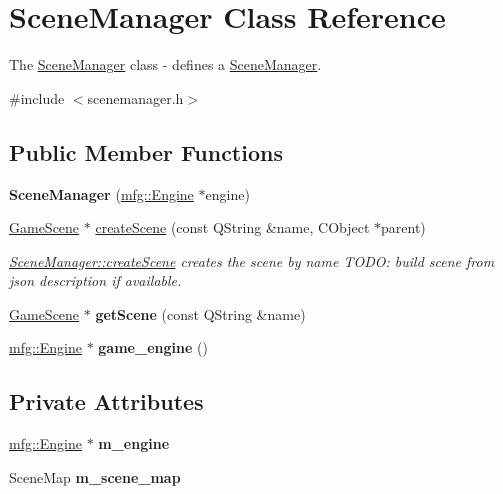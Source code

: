 \hypertarget{class_scene_manager}{}\section{Scene\+Manager Class Reference}
\label{class_scene_manager}


The \hyperlink{class_scene_manager}{Scene\+Manager} class -\/ defines a \hyperlink{class_scene_manager}{Scene\+Manager}.  




{\ttfamily \#include $<$scenemanager.\+h$>$}

\subsection*{Public Member Functions}
\begin{DoxyCompactItemize}
\item 
\mbox{\label{class_scene_manager_a017968ad7fea883b37597ccd43ee8d21}} 
{\bfseries Scene\+Manager} (\hyperlink{classmfg_1_1_engine}{mfg\+::\+Engine} $\ast$engine)
\item 
\hyperlink{class_game_scene}{Game\+Scene} $\ast$ \hyperlink{class_scene_manager_ac862660ed44b8ab110dec97ec90a9bad}{create\+Scene} (const Q\+String \&name, C\+Object $\ast$parent)
\begin{DoxyCompactList}\small\item\em \hyperlink{class_scene_manager_ac862660ed44b8ab110dec97ec90a9bad}{Scene\+Manager\+::create\+Scene} creates the scene by name T\+O\+DO\+: build scene from json description if available. \end{DoxyCompactList}\item 
\mbox{\label{class_scene_manager_a1f8394061bc73982c2893bb4984f4542}} 
\hyperlink{class_game_scene}{Game\+Scene} $\ast$ {\bfseries get\+Scene} (const Q\+String \&name)
\item 
\mbox{\label{class_scene_manager_a249162f1c24a0960e354a67cf9ed039d}} 
\hyperlink{classmfg_1_1_engine}{mfg\+::\+Engine} $\ast$ {\bfseries game\+\_\+engine} ()
\end{DoxyCompactItemize}
\subsection*{Private Attributes}
\begin{DoxyCompactItemize}
\item 
\mbox{\label{class_scene_manager_a487426cfd98ef3b57a7b0192d490b4ae}} 
\hyperlink{classmfg_1_1_engine}{mfg\+::\+Engine} $\ast$ {\bfseries m\+\_\+engine}
\item 
\mbox{\label{class_scene_manager_a84a59de256b2d0c2574d77c62b0f4ff3}} 
Scene\+Map {\bfseries m\+\_\+scene\+\_\+map}
\end{DoxyCompactItemize}


